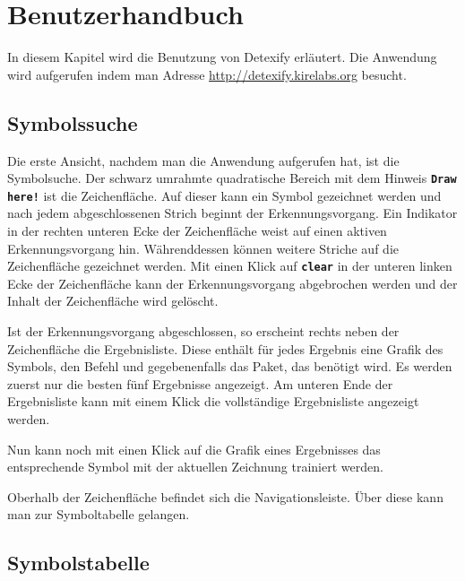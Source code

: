 \chapter{Benutzerhandbuch} %
\label{man:benutzerhandbuch}

In diesem Kapitel wird die Benutzung von Detexify erläutert. Die Anwendung wird aufgerufen indem man Adresse \url{http://detexify.kirelabs.org} besucht.

\section{Symbolssuche} %
\label{man:symbolsuche}

Die erste Ansicht, nachdem man die Anwendung aufgerufen hat, ist die Symbolsuche. Der schwarz umrahmte quadratische Bereich mit dem Hinweis \textbf{\texttt{Draw here!}} ist die Zeichenfläche. Auf dieser kann ein Symbol gezeichnet werden und nach jedem abgeschlossenen Strich beginnt der Erkennungsvorgang. Ein Indikator in der rechten unteren Ecke der Zeichenfläche weist auf einen aktiven Erkennungsvorgang hin. Währenddessen können weitere Striche auf die Zeichenfläche gezeichnet werden. Mit einen Klick auf \textbf{\texttt{clear}} in der unteren linken Ecke der Zeichenfläche kann der Erkennungsvorgang abgebrochen werden und der Inhalt der Zeichenfläche wird gelöscht.

Ist der Erkennungsvorgang abgeschlossen, so erscheint rechts neben der Zeichenfläche die Ergebnisliste. Diese enthält für jedes Ergebnis eine Grafik des Symbols, den Befehl und gegebenenfalls das Paket, das benötigt wird. Es werden zuerst nur die besten fünf Ergebnisse angezeigt. Am unteren Ende der Ergebnisliste kann mit einem Klick die vollständige Ergebnisliste angezeigt werden.

Nun kann noch mit einen Klick auf die Grafik eines Ergebnisses das entsprechende Symbol mit der aktuellen Zeichnung trainiert werden.

Oberhalb der Zeichenfläche befindet sich die Navigationsleiste. Über diese kann man zur Symboltabelle gelangen.


\section{Symbolstabelle} %
\label{man:symboltabelle}

